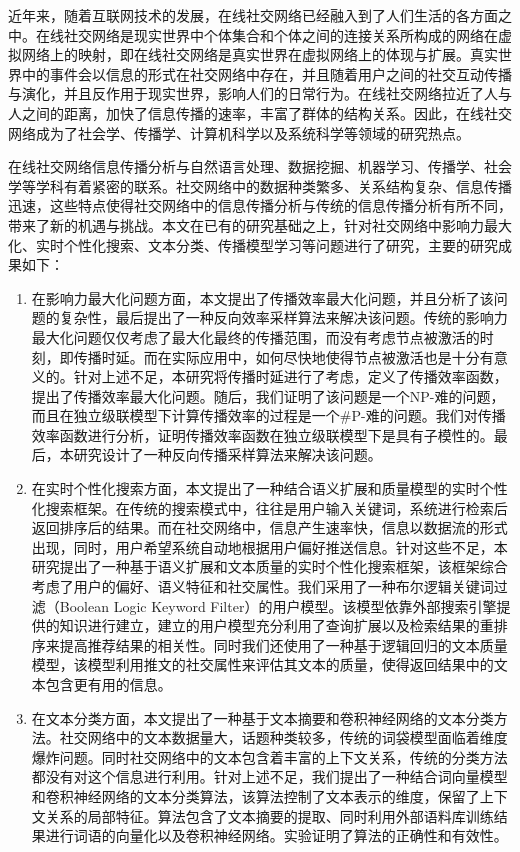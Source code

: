 \begin{cabstract}
近年来，随着互联网技术的发展，在线社交网络已经融入到了人们生活的各方面之中。在线社交网络是现实世界中个体集合和个体之间的连接关系所构成的网络在虚拟网络上的映射，即在线社交网络是真实世界在虚拟网络上的体现与扩展。真实世界中的事件会以信息的形式在社交网络中存在，并且随着用户之间的社交互动传播与演化，并且反作用于现实世界，影响人们的日常行为。在线社交网络拉近了人与人之间的距离，加快了信息传播的速率，丰富了群体的结构关系。因此，在线社交网络成为了社会学、传播学、计算机科学以及系统科学等领域的研究热点。

在线社交网络信息传播分析与自然语言处理、数据挖掘、机器学习、传播学、社会学等学科有着紧密的联系。社交网络中的数据种类繁多、关系结构复杂、信息传播迅速，这些特点使得社交网络中的信息传播分析与传统的信息传播分析有所不同，带来了新的机遇与挑战。本文在已有的研究基础之上，针对社交网络中影响力最大化、实时个性化搜索、文本分类、传播模型学习等问题进行了研究，主要的研究成果如下：
\begin{enumerate}
	\item 在影响力最大化问题方面，本文提出了传播效率最大化问题，并且分析了该问题的复杂性，最后提出了一种反向效率采样算法来解决该问题。传统的影响力最大化问题仅仅考虑了最大化最终的传播范围，而没有考虑节点被激活的时刻，即传播时延。而在实际应用中，如何尽快地使得节点被激活也是十分有意义的。针对上述不足，本研究将传播时延进行了考虑，定义了传播效率函数，提出了传播效率最大化问题。随后，我们证明了该问题是一个NP-难的问题，而且在独立级联模型下计算传播效率的过程是一个\#P-难的问题。我们对传播效率函数进行分析，证明传播效率函数在独立级联模型下是具有子模性的。最后，本研究设计了一种反向传播采样算法来解决该问题。
	\item 在实时个性化搜索方面，本文提出了一种结合语义扩展和质量模型的实时个性化搜索框架。在传统的搜索模式中，往往是用户输入关键词，系统进行检索后返回排序后的结果。而在社交网络中，信息产生速率快，信息以数据流的形式出现，同时，用户希望系统自动地根据用户偏好推送信息。针对这些不足，本研究提出了一种基于语义扩展和文本质量的实时个性化搜索框架，该框架综合考虑了用户的偏好、语义特征和社交属性。我们采用了一种布尔逻辑关键词过滤（Boolean Logic Keyword Filter）的用户模型。该模型依靠外部搜索引擎提供的知识进行建立，建立的用户模型充分利用了查询扩展以及检索结果的重排序来提高推荐结果的相关性。同时我们还使用了一种基于逻辑回归的文本质量模型，该模型利用推文的社交属性来评估其文本的质量，使得返回结果中的文本包含更有用的信息。
	\item 在文本分类方面，本文提出了一种基于文本摘要和卷积神经网络的文本分类方法。社交网络中的文本数据量大，话题种类较多，传统的词袋模型面临着维度爆炸问题。同时社交网络中的文本包含着丰富的上下文关系，传统的分类方法都没有对这个信息进行利用。针对上述不足，我们提出了一种结合词向量模型和卷积神经网络的文本分类算法，该算法控制了文本表示的维度，保留了上下文关系的局部特征。算法包含了文本摘要的提取、同时利用外部语料库训练结果进行词语的向量化以及卷积神经网络。实验证明了算法的正确性和有效性。

\end{enumerate}
\end{cabstract}
